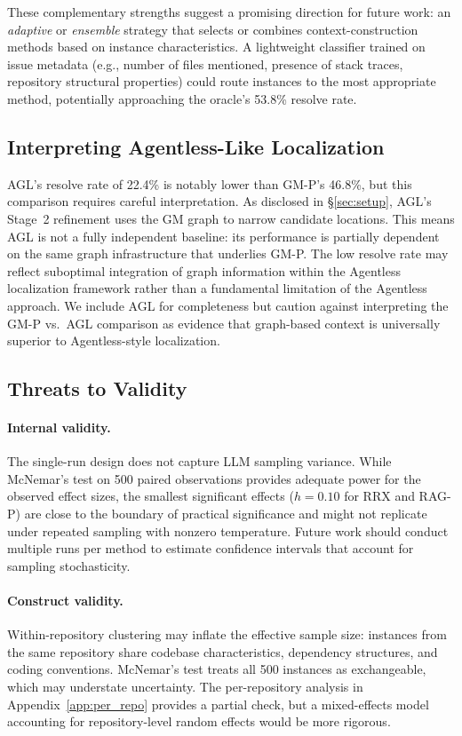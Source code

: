 These complementary strengths suggest a promising direction for future work: an \emph{adaptive} or \emph{ensemble} strategy that selects or combines context-construction methods based on instance characteristics. A lightweight classifier trained on issue metadata (e.g., number of files mentioned, presence of stack traces, repository structural properties) could route instances to the most appropriate method, potentially approaching the oracle's 53.8\% resolve rate.

\subsection{Interpreting Agentless-Like Localization}

AGL's resolve rate of 22.4\% is notably lower than GM-P's 46.8\%, but this comparison requires careful interpretation. As disclosed in \S\ref{sec:setup}, AGL's Stage~2 refinement uses the GM graph to narrow candidate locations. This means AGL is not a fully independent baseline: its performance is partially dependent on the same graph infrastructure that underlies GM-P. The low resolve rate may reflect suboptimal integration of graph information within the Agentless localization framework rather than a fundamental limitation of the Agentless approach. We include AGL for completeness but caution against interpreting the GM-P vs.\ AGL comparison as evidence that graph-based context is universally superior to Agentless-style localization.

\subsection{Threats to Validity}

\paragraph{Internal validity.} The single-run design does not capture LLM sampling variance. While McNemar's test on 500 paired observations provides adequate power for the observed effect sizes, the smallest significant effects ($h = 0.10$ for RRX and RAG-P) are close to the boundary of practical significance and might not replicate under repeated sampling with nonzero temperature. Future work should conduct multiple runs per method to estimate confidence intervals that account for sampling stochasticity.

\paragraph{Construct validity.} Within-repository clustering may inflate the effective sample size: instances from the same repository share codebase characteristics, dependency structures, and coding conventions. McNemar's test treats all 500 instances as exchangeable, which may understate uncertainty. The per-repository analysis in Appendix~\ref{app:per_repo} provides a partial check, but a mixed-effects model accounting for repository-level random effects would be more rigorous.

